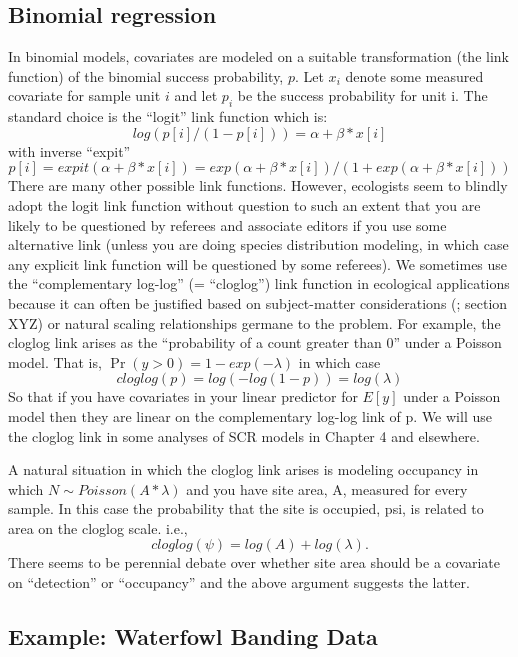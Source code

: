 \subsection{Binomial regression}

 In binomial models, covariates are modeled on a suitable transformation (the link function) of the binomial success probability, $p$.  Let  $x_{i}$ denote some measured covariate for sample unit $i$ and let $p_{i}$ be the success probability for unit i.  The standard choice is the ``logit'' link function which is:
\[
log(p[i]/(1-p[i])) = \alpha + \beta*x[i]
\]
with inverse ``expit''
\[
p[i] = expit(\alpha + \beta*x[i]) = exp(\alpha + \beta*x[i])/(1 + exp(\alpha + \beta*x[i])) 
\]
There are many other possible link functions. However, ecologists seem
to blindly adopt the logit link function without question to such an
extent that you are likely to be questioned by referees and associate
editors if you use some alternative link (unless you are doing species
distribution modeling, in which case any explicit link function will
be questioned by some referees).  We sometimes use the ``complementary
log-log'' (= ``cloglog'') link function in ecological applications
because it can often be justified based on subject-matter
considerations (\citet{royle_dorazio:2008}; section XYZ) or natural
scaling relationships germane to the problem.  For example, the
cloglog link arises as the ``probability of a count greater than 0''
under a Poisson model. That is, $\Pr(y>0) = 1-exp(- \lambda)$ in which case
\[
cloglog(p) =log(- log(1-p)) = log(\lambda)
\]
So that if you have covariates in your linear predictor for $E[y]$ under a Poisson model then they are linear on the complementary log-log link of p. We will use the cloglog link in some analyses of SCR models in Chapter 4 and elsewhere.  

A natural situation in which the cloglog link arises is modeling occupancy in which $N \sim Poisson(A*\lambda)$ and you have site area, A, measured for every sample. In this case the probability that the site is occupied, psi, is related to area on the cloglog scale. i.e.,
\[
 cloglog(\psi) = log(A) + log(\lambda).
\]
There seems to be perennial debate over whether site area should be a
covariate on ``detection'' or ``occupancy'' and the above argument
suggests the latter.


\subsection{ Example: Waterfowl Banding Data}

